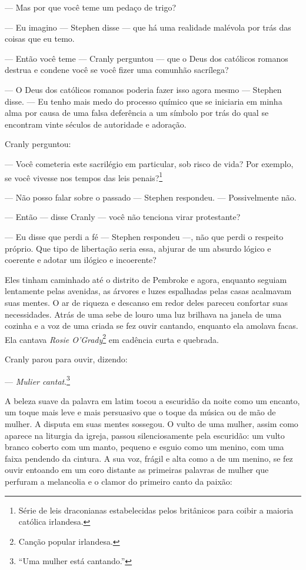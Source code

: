  --- Mas por que você teme um pedaço de trigo?

 --- Eu imagino --- Stephen disse --- que há uma realidade malévola por trás das
coisas que eu temo.

--- Então você teme --- Cranly perguntou --- que o Deus dos católicos romanos
destrua e condene você se você fizer uma comunhão sacrílega?

--- O Deus dos católicos romanos poderia fazer isso agora mesmo --- Stephen
disse. --- Eu tenho mais medo do processo químico que se iniciaria em minha
alma por causa de uma falsa deferência a um símbolo por trás do qual se
encontram vinte séculos de autoridade e adoração.

Cranly perguntou:

 --- Você cometeria este sacrilégio em particular, sob risco de vida? Por
exemplo, se você vivesse nos tempos das leis penais?\footnote{ Série de
leis draconianas estabelecidas pelos britânicos para coibir a maioria
católica irlandesa.}

 --- Não posso falar sobre o passado --- Stephen respondeu. --- Possivelmente não.

 --- Então --- disse Cranly --- você não tenciona virar protestante?

 --- Eu disse que perdi a fé --- Stephen respondeu ---,  não que perdi o respeito
próprio. Que tipo de libertação seria essa, abjurar de um absurdo
lógico e coerente e adotar um ilógico e incoerente?

Eles tinham caminhado até o distrito de Pembroke e agora, enquanto 
seguiam lentamente pelas avenidas, as árvores e luzes espalhadas pelas
casas acalmavam suas mentes. O ar de riqueza e descanso em redor deles
pareceu confortar suas necessidades. Atrás de uma sebe de louro uma luz
brilhava na janela de uma cozinha e a voz de uma criada se fez ouvir
cantando, enquanto ela amolava facas. Ela cantava \textit{Rosie
O’Grady}\footnote{ Canção popular irlandesa.} em cadência curta e quebrada.

Cranly parou para ouvir, dizendo:

 --- \textit{Mulier cantat}.\footnote{ “Uma mulher está cantando.”}

A beleza suave da palavra em latim tocou a escuridão da noite como um
encanto, um toque mais leve e mais persuasivo que o toque da música ou
de mão de mulher. A disputa em suas mentes sossegou. O vulto de uma
mulher, assim como aparece na liturgia da igreja, passou
silenciosamente pela escuridão: um vulto branco coberto com um manto,
pequeno e esguio como um menino, com uma faixa pendendo da cintura. A
sua voz, frágil e alta como a de um menino, se fez ouvir entoando em um
coro distante as primeiras palavras de mulher que perfuram a melancolia
e o clamor do primeiro canto da paixão:

